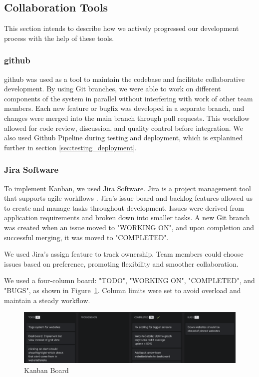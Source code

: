 \subsection{Collaboration Tools}
This section intends to describe how we actively progressed our development process with the help of these tools.

\subsubsection{\gls{github}}
\gls{github} was used as a tool to maintain the codebase and facilitate collaborative development. By using Git branches, we were able to work on different components of the system in parallel without interfering with work of other team members. Each new feature or bugfix was developed in a separate branch, and changes were merged into the main branch through pull requests. This workflow allowed for code review, discussion, and quality control before integration. We also used Github Pipeline during testing and deployment, which is explanined further in  section \ref{sec:testing_deployment}.

\subsubsection{Jira Software} 
\label{subsubsec:jira}

To implement Kanban, we used Jira Software. Jira is a project management tool that supports agile workflows \cite{Jira}. Jira's issue board and backlog features allowed us to create and manage tasks throughout development. Issues were derived from application requirements and broken down into smaller tasks. A new Git branch was created when an issue moved to "WORKING ON", and upon completion and successful merging, it was moved to "COMPLETED".

We used Jira’s assign feature to track ownership. Team members could choose issues based on preference, promoting flexibility and smoother collaboration.

We used a four-column board: "TODO", "WORKING ON", "COMPLETED", and "BUGS", as shown in Figure~\ref{fig:kanban_board}. Column limits were set to avoid overload and maintain a steady workflow.

\begin{figure}[H] 
\centering 
\includegraphics[width=1\linewidth]{figures/kanbanboard.png} 
\caption{Kanban Board} 
\label{fig:kanban_board} 
\end{figure}


